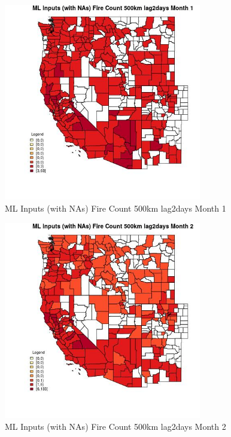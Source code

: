 \begin{figure} 
\centering  
\includegraphics[width=0.77\textwidth]{Code_Outputs/Report_ML_input_PM25_Step4_part_e_de_duplicated_aves_compiled_2019-05-21wNAs_CountyFire_Count_500km_lag2daysmedianMonth1.jpg} 
\caption{\label{fig:Report_ML_input_PM25_Step4_part_e_de_duplicated_aves_compiled_2019-05-21wNAsCountyFire_Count_500km_lag2daysmedianMonth1}ML Inputs (with NAs) Fire Count 500km lag2days Month 1} 
\end{figure} 
 

\begin{figure} 
\centering  
\includegraphics[width=0.77\textwidth]{Code_Outputs/Report_ML_input_PM25_Step4_part_e_de_duplicated_aves_compiled_2019-05-21wNAs_CountyFire_Count_500km_lag2daysmedianMonth2.jpg} 
\caption{\label{fig:Report_ML_input_PM25_Step4_part_e_de_duplicated_aves_compiled_2019-05-21wNAsCountyFire_Count_500km_lag2daysmedianMonth2}ML Inputs (with NAs) Fire Count 500km lag2days Month 2} 
\end{figure} 
 

